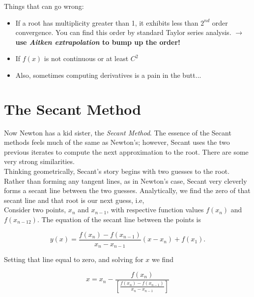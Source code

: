 \documentclass[paper=a4, fontsize=11pt]{scrartcl} %
\numberwithin{equation}{section} %
\numberwithin{figure}{section} %
\numberwithin{table}{section} %
\begin{document}
$ $\\

Things that can go wrong:\\

\begin{itemize}
\item If a root has multiplicity greater than 1, it exhibits less than $2^{nd}$ order convergence. You can find this order by standard Taylor series analysis. {\bf{$\rightarrow$ use \emph{Aitken extrapolation} to bump up the order!}}
\item If $f(x)$ is not continuous or at least $C^2$
\item Also, sometimes computing derivatives is a pain in the butt...
\end{itemize}







%
%

\section{The Secant Method}

Now Newton has a kid sister, the \emph{Secant Method}. The essence of the Secant methods feels much of the same as Newton's; however, Secant uses the two previous iterates to compute the next approximation to the root. There are some very strong similarities.\\

Thinking geometrically, Secant's story begins with two guesses to the root. Rather than forming any tangent lines, as in Newton's case, Secant very cleverly forms a secant line between the two guesses. Analytically, we find the zero of that secant line and that root is our next guess, i.e, \\

Consider two points, $x_n$ and $x_{n-1}$, with respective function values $f(x_n)$ and $f(x_{n-12})$. The equation of the secant line between the points is

$$y(x) = \frac{ f(x_n) - f(x_{n-1}) }{ x_n - x_{n-1} } (x - x_{n}) + f(x_1).$$

Setting that line equal to zero, and solving for $x$ we find

$$x = x_n - \frac{ f(x_n) }{  \left[\frac{f(x_n) - f(x_{n-1})}{x_n - x_{n-1}}\right]  }$$
\end{document}
